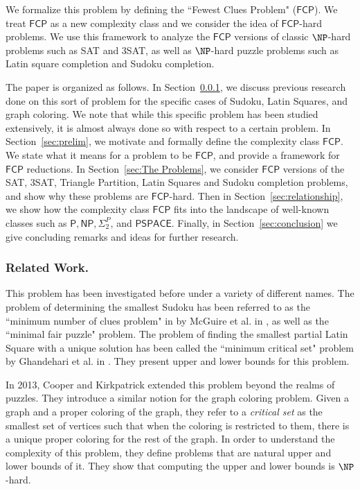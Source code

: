 \documentclass[runningheads,a4paper]{llncs}
\begin{document}
We formalize this problem by defining the ``Fewest Clues Problem" ($\mathsf{FCP}$). We treat $\mathsf{FCP}$ as a new complexity class and we consider the idea of $\mathsf{FCP}$-hard problems. We use this framework to analyze the $\mathsf{FCP}$ versions of classic $\NP$-hard problems such as SAT and 3SAT, as well as $\NP$-hard puzzle problems such as Latin square completion and Sudoku completion. 

The paper is organized as follows. In Section~\ref{sec:related}, we discuss previous research done on this sort of problem for the specific cases of Sudoku, Latin Squares, and graph coloring. We note that while this specific problem has been studied extensively, it is almost always done so with respect to a certain problem. In Section~\ref{sec:prelim}, we motivate and formally define the complexity class $\mathsf{FCP}$. We state what it means for a problem to be $\mathsf{FCP}$, and provide a framework for $\mathsf{FCP}$ reductions. In Section~\ref{sec:The Problems}, we consider $\mathsf{FCP}$ versions of the SAT, 3SAT, Triangle Partition, Latin Squares and Sudoku completion problems, and show why these problems are $\mathsf{FCP}$-hard. Then in Section~\ref{sec:relationship}, we show how the complexity class $\mathsf{FCP}$ fits into the landscape of well-known classes such as $\mathsf{P}, \mathsf{NP}, \Sigma_2^P$, and $\mathsf{PSPACE}$. Finally, in Section~\ref{sec:conclusion} we give concluding remarks and ideas for further research.


\subsubsection{Related Work.}
\label{sec:related}

This problem has been investigated before under a variety of different names. The problem of determining the smallest Sudoku has been referred to as the ``minimum number of clues problem" in
by McGuire et al. in \cite{mcguire2012there}, as well as the ``minimal fair puzzle" problem. The problem of finding the smallest partial Latin Square with a unique solution has been called the ``minimum critical set" problem by Ghandehari et al. in \cite{Ghandehari2005121}. They present upper and lower bounds for this problem. 

In 2013, Cooper and Kirkpatrick \cite{Cooper:2014:CSS:2612293.2612628} extended this problem beyond the realms of puzzles. They introduce a similar notion for the graph coloring problem. Given a graph and a proper coloring of the graph, they refer to a \emph{critical set} as the smallest set of vertices such that when the coloring is restricted to them, there is a unique proper coloring for the rest of the graph. In order to understand the complexity of this problem, they define problems that are natural upper and lower bounds of it. They show that computing the upper and lower bounds is $\NP$-hard. 
\end{document}
